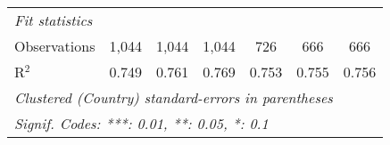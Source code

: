 \begin{tabular}{lcccccc}
   \midrule \emph{Fit statistics}\\
   Observations                                                                                       & 1,044   & 1,044          & 1,044          & 726            & 666            & 666\\  
   R$^2$                                                                                              & 0.749   & 0.761          & 0.769          & 0.753          & 0.755          & 0.756\\  
   \midrule
   \multicolumn{7}{l}{\emph{Clustered (Country) standard-errors in parentheses}}\\
   \multicolumn{7}{l}{\emph{Signif. Codes: ***: 0.01, **: 0.05, *: 0.1}}\\
\end{tabular}
\par\endgroup


